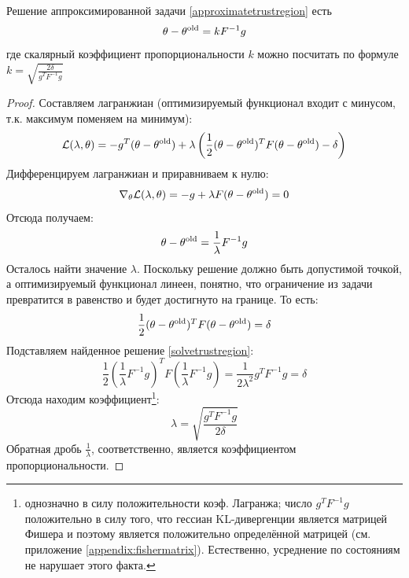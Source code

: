 \begin{theorem}
Решение аппроксимированной задачи \eqref{approximatetrustregion} есть
$$\theta - \theta^{\mathrm{old}} = kF^{-1}g$$
где скалярный коэффициент пропорциональности $k$ можно посчитать по формуле $k = \sqrt{\frac{2 \delta}{g^TF^{-1}g}}$
\begin{proof}
Составляем лагранжиан (оптимизируемый функционал входит с минусом, т.к. максимум поменяем на минимум):
$$\mathcal{L}(\lambda, \theta) = -g^T(\theta - \theta^{\mathrm{old}}) + \lambda \left( \frac{1}{2} (\theta - \theta^{\mathrm{old}})^T F (\theta - \theta^{\mathrm{old}}) - \delta \right)$$
Дифференцируем лагранжиан и приравниваем к нулю:
$$\nabla_\theta \mathcal{L}(\lambda, \theta) = -g + \lambda F (\theta - \theta^{\mathrm{old}}) = 0$$
Отсюда получаем:
\begin{equation}\label{solvetrustregion}
\theta - \theta^{\mathrm{old}} = \frac{1}{\lambda} F^{-1}g
\end{equation}
Осталось найти значение $\lambda$. Поскольку решение должно быть допустимой точкой, а оптимизируемый функционал линеен, понятно, что ограничение из задачи превратится в равенство и будет достигнуто на границе. То есть:
$$\frac{1}{2} (\theta - \theta^{\mathrm{old}})^T F (\theta - \theta^{\mathrm{old}}) = \delta$$
Подставляем найденное решение \eqref{solvetrustregion}:
$$\frac{1}{2} \left( \frac{1}{\lambda} F^{-1}g \right)^T F \left( \frac{1}{\lambda} F^{-1}g \right) = \frac{1}{2 \lambda^2} g^TF^{-1}g = \delta$$
Отсюда находим коэффициент\footnote{однозначно в силу положительности коэф. Лагранжа; число $g^TF^{-1}g$ положительно в силу того, что гессиан KL-дивергенции является матрицей Фишера и поэтому является положительно определённой матрицей (см. приложение \ref{appendix:fishermatrix}). Естественно, усреднение по состояниям не нарушает этого факта.}:
$$\lambda = \sqrt{\frac{g^TF^{-1}g}{2 \delta}}$$
Обратная дробь $\frac{1}{\lambda}$, соответственно, является коэффициентом пропорциональности.
\end{proof}
\end{theorem}

